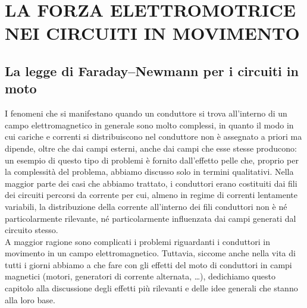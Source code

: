 \section{LA FORZA ELETTROMOTRICE NEI CIRCUITI IN MOVIMENTO}

\subsection{La legge di Faraday--Newmann per i circuiti in moto}

I fenomeni che si manifestano quando un conduttore si trova all'interno di un
campo elettromagnetico in generale sono molto complessi, in quanto il modo in
cui cariche e correnti si distribuiscono nel conduttore non \`e assegnato a
priori ma dipende, oltre che dai campi esterni, anche dai campi che esse stesse
producono: un esempio di questo tipo di problemi \`e fornito dall'effetto pelle
che, proprio per la complessit\`a del problema, abbiamo discusso solo in termini
qualitativi. Nella maggior parte dei casi che abbiamo trattato, i conduttori
erano costituiti dai fili dei circuiti percorsi da corrente per cui, almeno in
regime di correnti lentamente variabili, la distribuzione della corrente
all'interno dei fili conduttori non \`e n\'e particolarmente rilevante, n\'e
particolarmente influenzata dai campi generati dal circuito stesso.\\
A maggior ragione sono complicati i problemi riguardanti i conduttori in
movimento in un campo elettromagnetico. Tuttavia, siccome anche nella vita di
tutti i giorni abbiamo a che fare con gli effetti del moto di conduttori in
campi magnetici (motori, generatori di corrente alternata, \dots), dedichiamo
questo capitolo alla discussione degli effetti pi\`u rilevanti e delle idee
generali che stanno alla loro base.

